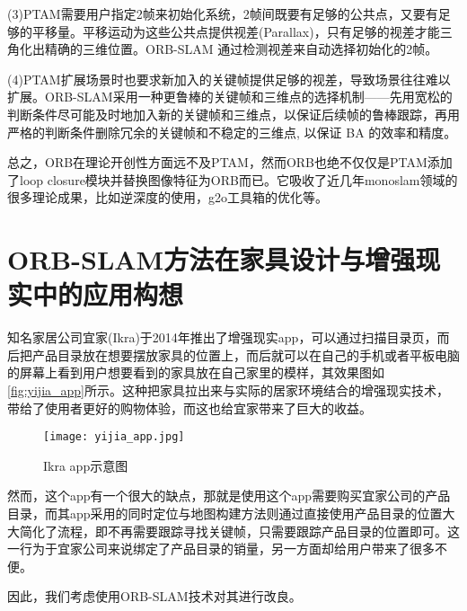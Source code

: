 (3)PTAM需要用户指定2帧来初始化系统，2帧间既要有足够的公共点，又要有足够的平移量。平移运动为这些公共点提供视差(Parallax)，只有足够的视差才能三角化出精确的三维位置。ORB-SLAM 通过检测视差来自动选择初始化的2帧。

(4)PTAM扩展场景时也要求新加入的关键帧提供足够的视差，导致场景往往难以扩展。ORB-SLAM采用一种更鲁棒的关键帧和三维点的选择机制——先用宽松的判断条件尽可能及时地加入新的关键帧和三维点，以保证后续帧的鲁棒跟踪，再用严格的判断条件删除冗余的关键帧和不稳定的三维点, 以保证 BA 的效率和精度。

总之，ORB在理论开创性方面远不及PTAM，然而ORB也绝不仅仅是PTAM添加了loop closure模块并替换图像特征为ORB而已。它吸收了近几年monoslam领域的很多理论成果，比如逆深度的使用，g2o工具箱的优化等。
\section{ORB-SLAM方法在家具设计与增强现实中的应用构想}
知名家居公司宜家(Ikra)于2014年推出了增强现实app，可以通过扫描目录页，而后把产品目录放在想要摆放家具的位置上，而后就可以在自己的手机或者平板电脑的屏幕上看到用户想要看到的家具放在自己家里的模样，其效果图如\autoref*{fig:yijia_app}所示。这种把家具拉出来与实际的居家环境结合的增强现实技术，带给了使用者更好的购物体验，而这也给宜家带来了巨大的收益。

\begin{figure}[!htbp]
\centering
\texttt{[image: yijia\_app.jpg]}
\caption{Ikra app示意图}
\label{fig:yijia_app}
\end{figure}

然而，这个app有一个很大的缺点，那就是使用这个app需要购买宜家公司的产品目录，而其app采用的同时定位与地图构建方法则通过直接使用产品目录的位置大大简化了流程，即不再需要跟踪寻找关键帧，只需要跟踪产品目录的位置即可。这一行为于宜家公司来说绑定了产品目录的销量，另一方面却给用户带来了很多不便。

因此，我们考虑使用ORB-SLAM技术对其进行改良。

